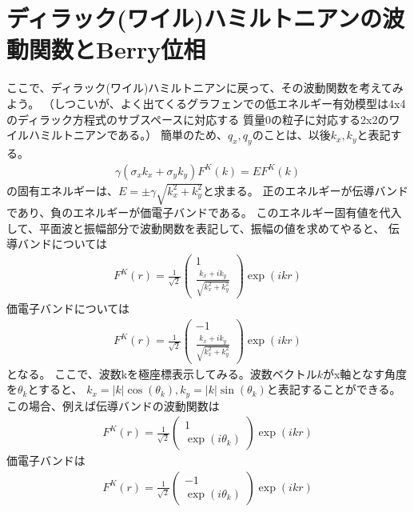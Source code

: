 \documentclass{article}
\begin{document}
\section{ディラック(ワイル)ハミルトニアンの波動関数とBerry位相}
ここで、ディラック(ワイル)ハミルトニアンに戻って、その波動関数を考えてみよう。
（しつこいが、よく出てくるグラフェンでの低エネルギー有効模型は4x4のディラック方程式のサブスペースに対応する
質量0の粒子に対応する2x2のワイルハミルトニアンである。）
簡単のため、$q_x, q_y$のことは、以後$k_x,k_y$と表記する。
\begin{eqnarray}
\gamma \left( 
\sigma_x k_x+\sigma_y k_y
\right)F^K(k)=E F^K(k)
\end{eqnarray}
の固有エネルギーは、$E=\pm \gamma \sqrt{k_x^2+k_y^2}$と求まる。
正のエネルギーが伝導バンドであり、負のエネルギーが価電子バンドである。
このエネルギー固有値を代入して、平面波と振幅部分で波動関数を表記して、振幅の値を求めてやると、
伝導バンドについては
\begin{eqnarray}
F^K(r)=\frac{1}{\sqrt{2}}  \left( 
 \begin{array}{c}
	1  \\
	\frac{k_x+ik_y}{\sqrt{k_x^2+k_y^2}}
 \end{array}
\right) \exp (ikr)
\end{eqnarray}
価電子バンドについては
\begin{eqnarray}
F^K(r)=\frac{1}{\sqrt{2}}  \left( 
 \begin{array}{c}
	-1  \\
	\frac{k_x+ik_y}{\sqrt{k_x^2+k_y^2}}
 \end{array}
\right) \exp (ikr)
\end{eqnarray}
となる。
ここで、波数kを極座標表示してみる。波数ベクトル$k$がx軸となす角度を$\theta_k$とすると、
$k_x=|k|\cos(\theta_k),k_y=|k|\sin(\theta_k) $と表記することができる。
この場合、例えば伝導バンドの波動関数は
\begin{eqnarray}
F^K(r)=\frac{1}{\sqrt{2}}  \left( 
 \begin{array}{c}
	1  \\
	\exp(i\theta_k)
 \end{array}
\right) \exp (ikr)
\end{eqnarray}
価電子バンドは
\begin{eqnarray}
F^K(r)=\frac{1}{\sqrt{2}}  \left( 
 \begin{array}{c}
	-1  \\
	\exp(i\theta_k)
 \end{array}
\right) \exp (ikr)
\end{eqnarray}
\end{document}
